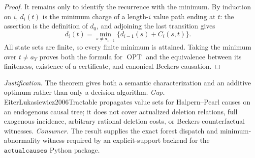 \documentclass{article}
\begin{document}
\begin{proof}
It remains only to identify the recurrence with the minimum.  By induction on \(i\), \(d_i(t)\) is the minimum charge of a length-\(i\) value path ending at \(t\): the assertion is the definition of \(d_0\), and adjoining the last transition gives
\[
 d_i(t)=\min_{s\ne a_{i-1}}\{d_{i-1}(s)+C_i(s,t)\}.
\]
All state sets are finite, so every finite minimum is attained.  Taking the minimum over \(t\ne a_Y\) proves both the formula for \(\operatorname{OPT}\) and the equivalence between its finiteness, existence of a certificate, and canonical Beckers causation.
\end{proof}
\par\smallskip\noindent \textit{Justification.} The theorem gives both a semantic characterization and an additive optimum rather than only a decision algorithm. \textit{Gap.} EiterLukasiewicz2006Tractable propagates value sets for Halpern--Pearl causes on an endogenous causal tree; it does not cover actualized deletion relations, full exogenous incidence, arbitrary rational deletion costs, or Beckers counterfactual witnesses. \textit{Consumer.} The result supplies the exact forest dispatch and minimum-abnormality witness required by an explicit-support backend for the \(\texttt{actualcauses}\) Python package.
\end{document}
